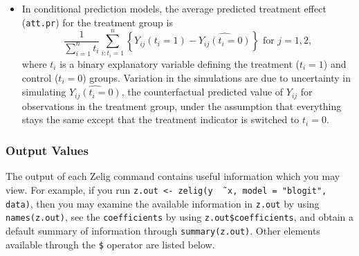 \documentclass{article}
\begin{document}
\begin{itemize}
\item In conditional prediction models, the average predicted treatment
  effect ({\tt att.pr}) for the treatment group is 
    \begin{equation*} \frac{1}{\sum_{i=1}^n t_i}\sum_{i:t_i=1}^n \left\{ Y_{ij}(t_i=1) -
      \widehat{Y_{ij}(t_i=0)} \right\} \textrm{ for } j = 1,2,
    \end{equation*} 
    where $t_i$ is a binary explanatory variable defining the treatment
    ($t_i=1$) and control ($t_i=0$) groups.  Variation in the
    simulations are due to uncertainty in simulating
    $\widehat{Y_{ij}(t_i=0)}$, the counterfactual predicted value of
    $Y_{ij}$ for observations in the treatment group, under the
    assumption that everything stays the same except that the
    treatment indicator is switched to $t_i=0$.
\end{itemize}

\subsubsection{Output Values}

The output of each Zelig command contains useful information which you
may view.  For example, if you run \texttt{z.out <- zelig(y \~\,
  x, model = "blogit", data)}, then you may examine the available
information in \texttt{z.out} by using \texttt{names(z.out)},
see the {\tt coefficients} by using {\tt z.out\$coefficients}, and
obtain a default summary of information through {\tt summary(z.out)}.
Other elements available through the {\tt \$} operator are listed
below.
\end{document}

